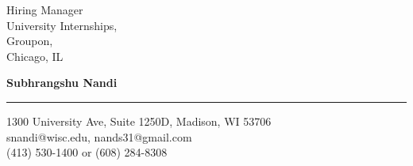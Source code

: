 \documentclass{letter} %
\begin{document}
\signature{Subhrangshu Nandi}           %
\longindentation=0pt                       %
\let\raggedleft\raggedright                %
 
 
\begin{letter}
{Hiring Manager \\
University Internships,\\
Groupon, \\
Chicago, IL
}



\begin{flushleft}
{\bf Subhrangshu Nandi}
\end{flushleft}
\medskip\hrule height 1pt
\begin{flushright}
\hfill 1300 University Ave, Suite 1250D, Madison, WI 53706 \\
\hfill snandi@wisc.edu, nands31@gmail.com\\
\hfill (413) 530-1400 or (608) 284-8308
\end{flushright} 
\vfill %


\end{letter}
\end{document}
